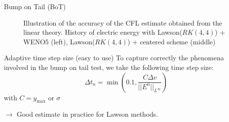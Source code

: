 \documentclass{beamer}
\begin{document}
\begin{frame}{Bump on Tail (BoT)}
{\begin{figure}
      \caption{Illustration of the accuracy of the CFL estimate obtained from the linear theory. History of electric energy with Lawson($RK(4,4)$) + WENO5 (left),  Lawson($RK(4,4)$) + centered scheme (middle)}
    \end{figure}
  }
\end{frame}
\begin{frame}{Adaptive time step size (easy to use)}
  To capture correctly the phenomena involved in the bump on tail test, we take the following time step size:
  $$
    \Delta t_n = \min\left(0.1,\frac{C\Delta v}{||E^n||_{L^\infty}}\right)
  $$
  with $C = y_\text{max}$ or $\sigma$

  $\rightarrow$ Good estimate in practice for Lawson methods.
\end{frame}
\end{document}
